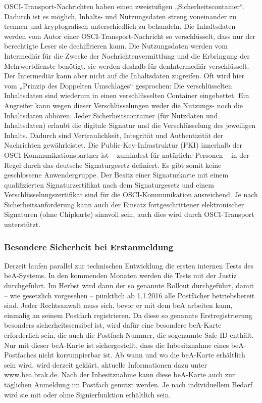 \noindent
OSCI-Transport-Nachrichten haben einen zweistufigen „Sicherheitscontainer“. Dadurch ist es möglich, Inhalts- und Nutzungsdaten streng voneinander zu trennen und kryptografisch unterschiedlich zu behandeln. Die Inhaltsdaten werden vom Autor einer OSCI-Transport-Nachricht so verschlüsselt, dass nur der berechtigte Leser sie dechiffrieren kann. Die Nutzungsdaten werden vom Intermediär für die Zwecke der Nachrichtenvermittlung und die Erbringung der Mehrwertdienste benötigt, sie werden deshalb für denIntermediär verschlüsselt. Der Intermediär kann aber nicht auf die Inhaltsdaten zugreifen. Oft wird hier vom „Prinzip des Doppelten Umschlages“ gesprochen: Die verschlüsselten Inhaltsdaten sind wiederum in einen verschlüsselten Container eingebettet. Ein Angreifer kann wegen dieser Verschlüsselungen weder die Nutzungs- noch die Inhaltsdaten abhören.
Jeder Sicherheitscontainer (für Nutzdaten und Inhaltsdaten) erlaubt die digitale Signatur und die Verschlüsselung des jeweiligen Inhalts. Dadurch sind Vertraulichkeit, Integrität und Authentizität der Nachrichten gewährleistet.
Die Public-Key-Infrastruktur (PKI) innerhalb der OSCI-Kommunikationspartner ist – zumindest für natürliche Personen – in der Regel durch das deutsche Signaturgesetz definiert. Es gibt somit keine geschlossene Anwendergruppe. Der Besitz einer Signaturkarte mit einem qualifizierten Signaturzertifikat nach dem Signaturgesetz und einem Verschlüsselungszertifikat sind für die OSCI-Kommunikation ausreichend. Je nach Sicherheitsanforderung kann auch der Einsatz fortgeschrittener elektronischer Signaturen (ohne Chipkarte) sinnvoll sein, auch dies wird durch OSCI-Transport unterstützt.

\subsubsection{Besondere Sicherheit bei Erstanmeldung}
Derzeit laufen parallel zur technischen Entwicklung die ersten internen Tests des beA-Systems. In den kommenden Monaten werden die Tests mit der Justiz durchgeführt. Im Herbst wird dann der so genannte Rollout durchgeführt, damit – wie gesetzlich vorgesehen – pünktlich ab 1.1.2016 alle Postfächer betriebsbereit sind. Jeder Rechtsanwalt muss sich, bevor er mit dem beA arbeiten kann, einmalig an seinem Postfach registrieren. Da diese so genannte Erstregistrierung besonders sicherheitssensibel ist, wird dafür eine besondere beA-Karte erforderlich sein, die auch die Postfach-Nummer, die sogenannte Safe-ID enthält. Nur mit dieser beA-Karte ist sichergestellt, dass die Inbesitznahme eines beA-Postfaches nicht korrumpierbar ist. Ab wann und wo die beA-Karte erhältlich sein wird, wird derzeit geklärt, aktuelle Informationen dazu unter www.bea.brak.de. Nach der Inbesitznahme kann diese beA-Karte auch zur täglichen Anmeldung im Postfach genutzt werden. Je nach individuellem Bedarf wird sie mit oder ohne Signierfunktion erhältlich sein.

